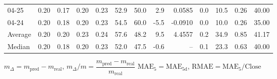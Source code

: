 \begin{threeparttable}
{\begin{tabular}{lrrrrrrrrrrrr}
  04-25 &          0.20 &          0.17 &          0.20 &        0.23 &                52.9 &                50.0 &        2.9 &       0.0585 &                 0.0 &             10.5 &            0.26 &                  40.00 \\
  04-24 &          0.20 &          0.18 &          0.20 &        0.23 &                54.5 &                60.0 &       -5.5 &      -0.0910 &                 0.0 &             10.0 &            0.26 &                  35.00 \\
Average &          0.20 &          0.20 &          0.23 &        0.24 &                57.6 &                48.2 &        9.5 &       4.4557 &                 0.2 &             34.9 &            0.85 &                  41.17 \\
 Median &          0.20 &          0.18 &          0.20 &        0.23 &                52.0 &                47.5 &       -0.6 &           -- &                 0.1 &             23.3 &            0.63 &                  40.00 \\
\bottomrule
\end{tabular}
}
\begin{tablenotes}\footnotesize
\item $m_\Delta=m_{\text{pred}}-m_{\text{real}}$,
$m_\Delta/m=\dfrac{m_{\text{pred}}-m_{\text{real}}}{m_{\text{real}}}$
$\mathrm{MAE}_5=\mathrm{MAE}_{5\text{d}}$,
$\mathrm{RMAE}=\mathrm{MAE}_5/\text{Close}$
\end{tablenotes}
\end{threeparttable}
\endgroup

